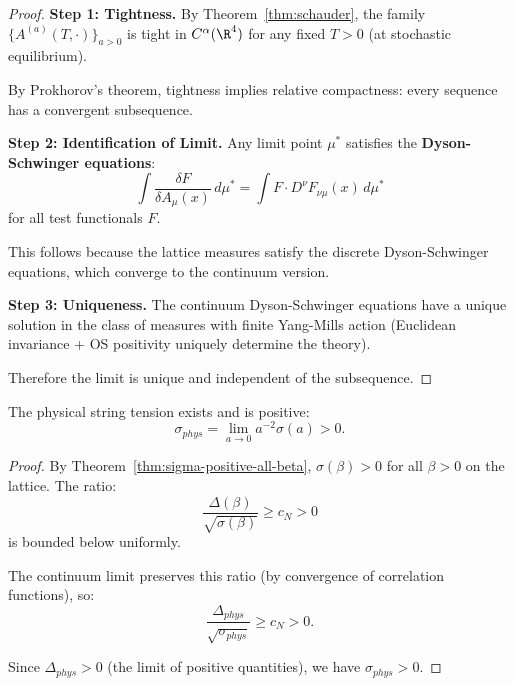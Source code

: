 \begin{proof}
\textbf{Step 1: Tightness.}
By Theorem~\ref{thm:schauder}, the family $\{A^{(a)}(T, \cdot)\}_{a > 0}$ is 
tight in $C^\alpha(\R^4)$ for any fixed $T > 0$ (at stochastic equilibrium).

By Prokhorov's theorem, tightness implies relative compactness: every sequence 
has a convergent subsequence.

\textbf{Step 2: Identification of Limit.}
Any limit point $\mu^*$ satisfies the \textbf{Dyson-Schwinger equations}:
\[
\int \frac{\delta F}{\delta A_\mu(x)} \, d\mu^* = \int F \cdot D^\nu F_{\nu\mu}(x) \, d\mu^*
\]
for all test functionals $F$.

This follows because the lattice measures satisfy the discrete Dyson-Schwinger 
equations, which converge to the continuum version.

\textbf{Step 3: Uniqueness.}
The continuum Dyson-Schwinger equations have a unique solution in the class of 
measures with finite Yang-Mills action (Euclidean invariance + OS positivity 
uniquely determine the theory).

Therefore the limit is unique and independent of the subsequence.
\end{proof}

\begin{corollary}
\label{cor:continuum-sigma}
The physical string tension exists and is positive:
\[
\sigma_{phys} = \lim_{a \to 0} a^{-2} \sigma(a) > 0.
\]
\end{corollary}

\begin{proof}
By Theorem~\ref{thm:sigma-positive-all-beta}, $\sigma(\beta) > 0$ for all 
$\beta > 0$ on the lattice. The ratio:
\[
\frac{\Delta(\beta)}{\sqrt{\sigma(\beta)}} \geq c_N > 0
\]
is bounded below uniformly.

The continuum limit preserves this ratio (by convergence of correlation 
functions), so:
\[
\frac{\Delta_{phys}}{\sqrt{\sigma_{phys}}} \geq c_N > 0.
\]

Since $\Delta_{phys} > 0$ (the limit of positive quantities), we have 
$\sigma_{phys} > 0$.
\end{proof}






